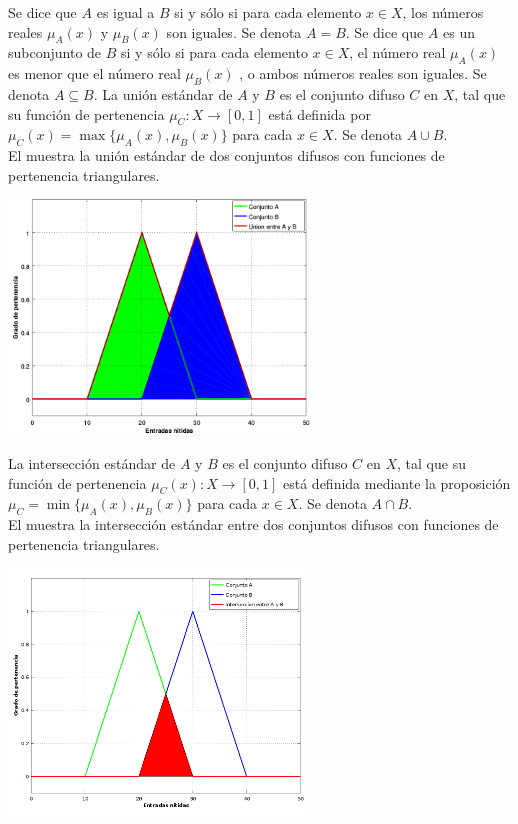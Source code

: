  Se dice que $A$ es igual a $B$ si y sólo si para cada elemento $x \in X$, los números reales $\mu_{A}(x)$ y $\mu_{B}(x)$ son iguales. Se denota $A = B$.
Se dice que $A$ es un subconjunto de $B$ si y sólo si para cada elemento $x \in X$, el número real  $\mu_{A}(x)$  es menor que el número real  $\mu_{B}(x)$   , o ambos números reales son iguales. Se denota $A \subseteq B$.
La unión estándar de $A$ y $B$ es el conjunto difuso $C$ en $X$, tal que su función de pertenencia $\mu_{C}:X \rightarrow [0, 1]$ está definida por $\mu_{C}(x)=\max {{\{\mu_{A}(x),\mu_{B}(x)\}}}$ para cada $x \in X$. Se denota $A \cup B$. \\
El  muestra la unión estándar de dos conjuntos difusos con funciones de pertenencia triangulares.
\begin{grafico}[titulo = Union estandar en conjuntos difusos, etiqueta=graficoUnion]
\includegraphics[width=8cm]{graficas/union.png}
\end{grafico}
La intersección estándar de $A$ y $B$ es el conjunto difuso $C$ en $X$, tal que su función de pertenencia $\mu_{C}(x):X \rightarrow [0, 1]$ está definida mediante la proposición $\mu_{C}= \min \{\mu_{A}(x), \mu_{B}(x) \}$ para cada $x \in X$. Se denota $A \cap B$.\\
El  muestra la intersección estándar entre dos conjuntos difusos con funciones de pertenencia triangulares.
\begin{grafico}[titulo = Intersección estandar en conjuntos difusos, etiqueta = graficoInterseccion]
\includegraphics[width=8cm]{graficas/interseccion.png}
\end{grafico}
